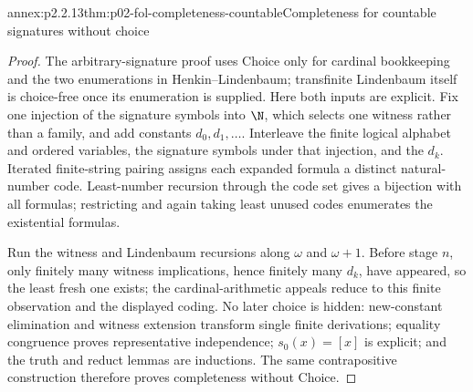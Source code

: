 \begin{annexitem}{annex:p2.2.13}{thm:p02-fol-completeness-countable}{Completeness for countable signatures without choice}
\begin{proof}
The arbitrary-signature proof uses Choice only for cardinal bookkeeping and
the two enumerations in Henkin--Lindenbaum; transfinite Lindenbaum itself is
choice-free once its enumeration is supplied.  Here both inputs are explicit.
Fix one injection of the signature symbols into \(\N\), which selects one
witness rather than a family, and add constants \(d_0,d_1,\ldots\).
Interleave the finite logical alphabet and ordered variables, the signature
symbols under that injection, and the \(d_k\).  Iterated finite-string pairing
assigns each expanded formula a distinct natural-number code.  Least-number
recursion through the code set gives a bijection with all formulas; restricting
and again taking least unused codes enumerates the existential formulas.

Run the witness and Lindenbaum recursions along \(\omega\) and
\(\omega+1\).  Before stage \(n\), only finitely many witness implications,
hence finitely many \(d_k\), have appeared, so the least fresh one exists;
the cardinal-arithmetic appeals reduce to this finite observation and the
displayed coding.  No later choice is hidden: new-constant elimination and
witness extension transform single finite derivations; equality congruence
proves representative independence; \(s_0(x)=[x]\) is explicit; and the
truth and reduct lemmas are inductions.  The same contrapositive construction
therefore proves completeness without Choice.
\end{proof}
\end{annexitem}

